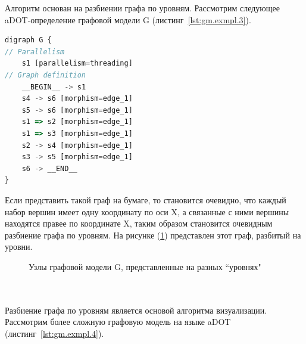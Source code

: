 Алгоритм основан на разбиении графа по уровням. Рассмотрим следующее aDOT-определение графовой модели \textsf{G} (листинг~\ref{lst:gm.exmpl.3}).

\begin{lstlisting}[label={lst:gm.exmpl.3}, caption={Пример aDOT-определение простейшей графовой модели G}, language=JavaScript]
digraph G {
// Parallelism
    s1 [parallelism=threading]
// Graph definition
    __BEGIN__ -> s1
    s4 -> s6 [morphism=edge_1]
    s5 -> s6 [morphism=edge_1]
    s1 => s2 [morphism=edge_1]
    s1 => s3 [morphism=edge_1]
    s2 -> s4 [morphism=edge_1]
    s3 -> s5 [morphism=edge_1]
    s6 -> __END__ 
}
\end{lstlisting}

Если представить такой граф на бумаге, то становится очевидно, что каждый набор вершин имеет одну координату по оси X, а связанные с ними вершины находятся правее по координате X, таким образом становится очевидным разбиение графа по уровням. На рисунке (\ref{fig:graph_levels}) представлен этот граф, разбитый на уровни.

\begin{figure}[h!]
\caption{Узлы графовой модели \textsf{G}, представленные на разных ``уровнях"}
\label{fig:graph_levels}
\end{figure}

~\\~\\

Разбиение графа по уровням является основой алгоритма визуализации. Рассмотрим более сложную графовую модель на языке aDOT (листинг~\ref{lst:gm.exmpl.4}).


